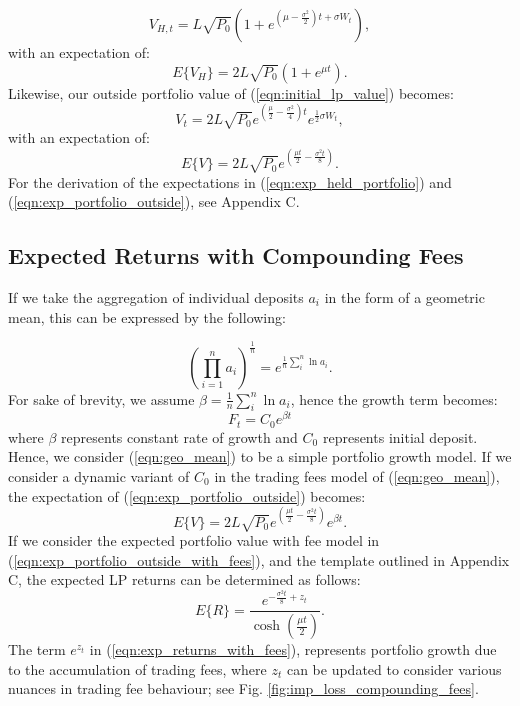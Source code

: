 \documentclass[journal,twocolumn,12pt]{ieeesyscoin}
\begin{document}
\begin{equation}\label{eqn:held_portfolio}
  V_{H,t} = L \sqrt{P_{0}}(1 + e^{(\mu - \frac{\sigma^2}{2})t + \sigma W_{t} }),
\end{equation}
with an expectation of:
\begin{equation}\label{eqn:exp_held_portfolio}
  E\{V_{H}\} = 2 L \sqrt{P_{0}} (1 + e^{\mu t}).
\end{equation}
Likewise, our outside portfolio value of (\ref{eqn:initial_lp_value}) becomes:
\begin{equation}\label{eqn:portfolio_outside}
  V_{t} = 2L \sqrt{P_{0}} e^{(\frac{\mu}{2} - \frac{\sigma^2}{4})t } e^{   \frac{1}{2}\sigma W_{t}}, 
\end{equation}
with an expectation of:
\begin{equation}\label{eqn:exp_portfolio_outside}
  E\{V\} = 2 L \sqrt{P_{0}}  e^{(\frac{\mu t}{2} - \frac{\sigma^2 t}{8})}.
\end{equation}
For the derivation of the expectations in (\ref{eqn:exp_held_portfolio}) and (\ref{eqn:exp_portfolio_outside}), see Appendix C.

\subsection{Expected Returns with Compounding Fees}
\label{sec:exp_lp_returns}
If we take the aggregation of individual deposits $a_{i}$ in the form of a geometric mean, this can be expressed by the following:

\begin{equation}\label{eqn:geo_mean}
  (\prod_{i=1}^{n}a_{i})^{\frac{1}{n}} = e^{\frac{1}{n}\sum_{i}^{n}\ln a_{i}}.
\end{equation}
For sake of brevity, we assume $\beta = \frac{1}{n}\sum_{i}^{n}\ln a_{i}$, hence the growth term becomes:
\begin{equation}\label{eqn:geo_mean}
  F_{t} = C_{0} e^{\beta t}
\end{equation}
where $\beta$ represents constant rate of growth and $C_{0}$ represents initial deposit. Hence, we consider (\ref{eqn:geo_mean}) to be a simple portfolio growth model. If we consider a dynamic variant of $C_{0}$ in the trading fees model of (\ref{eqn:geo_mean}), the expectation of (\ref{eqn:exp_portfolio_outside}) becomes:
\begin{equation}\label{eqn:exp_portfolio_outside_with_fees}
  E\{V\} = 2 L \sqrt{P_{0}}  e^{(\frac{\mu t}{2} - \frac{\sigma^2 t}{8})}e^{ \beta t}.
\end{equation}
If we consider the expected portfolio value with fee model in (\ref{eqn:exp_portfolio_outside_with_fees}), and the template outlined in Appendix C, the expected LP returns can be determined as follows:  
\begin{equation}\label{eqn:exp_returns_with_fees}
  E\{R\} = \frac{e^{-\frac{\sigma^2 t}{8} + z_{t}}}{\cosh (\frac{\mu t}{2})}.
\end{equation}
The term $e^{z_{t}}$ in (\ref{eqn:exp_returns_with_fees}), represents portfolio growth due to the accumulation of trading fees, where $z_{t}$ can be updated to consider various nuances in trading fee behaviour; see Fig. \ref{fig:imp_loss_compounding_fees}.
\end{document}
